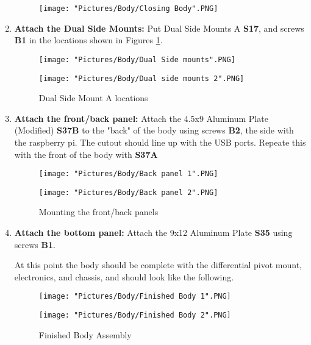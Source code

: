 \documentclass[12pt]{article}
\begin{document}
\begin{enumerate}
\begin{figure}[H]
	\centering
	\texttt{[image: "Pictures/Body/Closing Body".PNG]}
\end{figure}

\item \textbf{Attach the Dual Side Mounts: } Put Dual Side Mounts A \textbf{S17}, and screws \textbf{B1} in the locations shown in Figures \ref{Dual Side Mounts}. 

\begin{figure}[H]
  \centering
  \begin{minipage}[b]{0.40\textwidth}
    \texttt{[image: "Pictures/Body/Dual Side mounts".PNG]}
  \end{minipage}
  \hfill
  \begin{minipage}[b]{0.40\textwidth}
    \texttt{[image: "Pictures/Body/Dual side mounts 2".PNG]}
  \end{minipage}
  \caption{Dual Side Mount A locations}
  \label{Dual Side Mounts}
\end{figure}

\item \textbf{Attach the front/back panel: } Attach the 4.5x9 Aluminum Plate (Modified) \textbf{S37B} to the "back" of the body using screws \textbf{B2}, the side with the raspberry pi. The cutout should line up with the USB ports. Repeate this with the front of the body with \textbf{S37A}

\begin{figure}[H]
  \centering
  \begin{minipage}[b]{0.40\textwidth}
    \texttt{[image: "Pictures/Body/Back panel 1".PNG]}
  \end{minipage}
  \hfill
  \begin{minipage}[b]{0.40\textwidth}
    \texttt{[image: "Pictures/Body/Back panel 2".PNG]}
  \end{minipage}
  \caption{Mounting the front/back panels}
  \label{front/back panels}
\end{figure}

\item \textbf{Attach the bottom panel: } Attach the 9x12 Aluminum Plate \textbf{S35} using screws \textbf{B1}. 

At this point the body should be complete with the differential pivot mount, electronics, and chassis, and should look like the following. 

\begin{figure}[H]
  \centering
  \begin{minipage}[b]{0.45\textwidth}
    \texttt{[image: "Pictures/Body/Finished Body 1".PNG]}
  \end{minipage}
  \hfill
  \begin{minipage}[b]{0.45\textwidth}
    \texttt{[image: "Pictures/Body/Finished Body 2".PNG]}
  \end{minipage}
  \caption{Finished Body Assembly}
\end{figure}

\end{enumerate}
\end{document}
